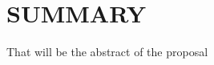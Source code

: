 \documentclass[a4paper,11pt]{article}
\begin{document}


\newpage
\setcounter{tocdepth}{1}
\setcounter{section}{-1}
\tableofcontents



\newpage
\section{SUMMARY}
\label{sec:summary}







\let\citeBk=\cite
\let\cite=\footcite


That will be the abstract of the proposal


% 


\end{document}
